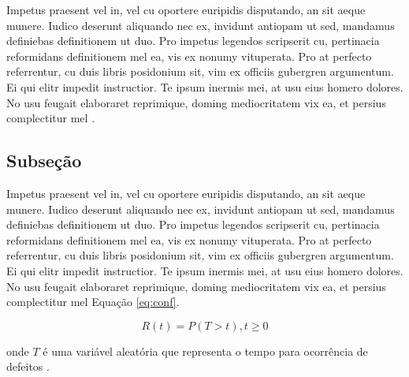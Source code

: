 		Impetus praesent vel in, vel cu oportere euripidis disputando, an sit aeque munere. Iudico deserunt aliquando nec ex, invidunt antiopam ut sed, mandamus definiebas definitionem ut duo. Pro impetus legendos scripserit cu, pertinacia reformidans definitionem mel ea, vis ex nonumy vituperata. Pro at perfecto referrentur, cu duis libris posidonium sit, vim ex officiis gubergren argumentum. Ei qui elitr impedit instructior. Te ipsum inermis mei, at usu eius homero dolores. No usu feugait elaboraret reprimique, doming mediocritatem vix ea, et persius complectitur mel \cite{Maciel2012}.

		\subsection{Subseção}

			Impetus praesent vel in, vel cu oportere euripidis disputando, an sit aeque munere. Iudico deserunt aliquando nec ex, invidunt antiopam ut sed, mandamus definiebas definitionem ut duo. Pro impetus legendos scripserit cu, pertinacia reformidans definitionem mel ea, vis ex nonumy vituperata. Pro at perfecto referrentur, cu duis libris posidonium sit, vim ex officiis gubergren argumentum. Ei qui elitr impedit instructior. Te ipsum inermis mei, at usu eius homero dolores. No usu feugait elaboraret reprimique, doming mediocritatem vix ea, et persius complectitur mel Equação \ref{eq:conf}.

			\begin{equation}
				R(t) = P(T > t), t \ge 0
				\label{eq:conf}
			\end{equation}

			\noindent onde $T$ é uma variável aleatória que representa o tempo para ocorrência de defeitos \cite{Xie2004}.
